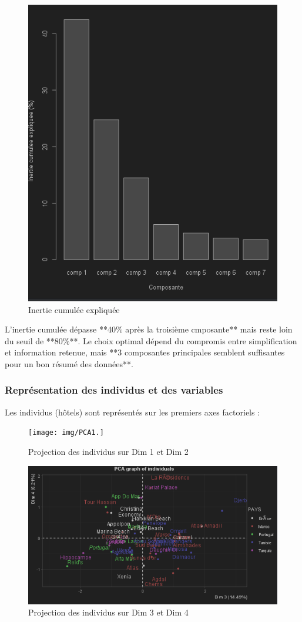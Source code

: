 \documentclass{article}
\begin{document}
    \begin{figure}[H]
        \centering
        \includegraphics[width=0.6\linewidth]{img/inertie_cumulee}
        \caption{Inertie cumulée expliquée}
    \end{figure}

    L’inertie cumulée dépasse **40\% après la troisième cmposante** mais reste loin du seuil de **80\%**.
    Le choix optimal dépend du compromis entre simplification et information retenue, mais **3 composantes principales semblent suffisantes pour un bon résumé des données**.

    \subsubsection{Représentation des individus et des variables}

    Les individus (hôtels) sont représentés sur les premiers axes factoriels :

    \begin{figure}[H]
        \centering
        \texttt{[image: img/PCA1.]}
        \caption{Projection des individus sur Dim 1 et Dim 2}
    \end{figure}

    \begin{figure}[H]
        \centering
        \includegraphics[width=0.6\linewidth]{img/PCA2}
        \caption{Projection des individus sur Dim 3 et Dim 4}
    \end{figure}
\end{document}
